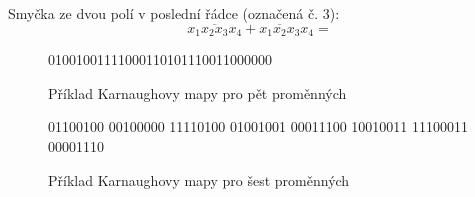      Smyčka ze dvou polí v poslední řádce (označená č. 3):
     \begin{equation}
       x_1\overline{x_2x_3}x_4 + x_1\overline{x_2}x_3x_4 = 
     \end{equation}     
     \begin{figure}[ht!]
         \centering
            {01001001111000110101110011000000}{}  
        \caption{Příklad Karnaughovy mapy pro pět proměnných}\label{CES:karnaugh_5}
      \end{figure}

     \begin{figure}[hb!]
         \centering                 
          {{0}{1}{1}{0}{0}{1}{0}{0}%
           {0}{0}{1}{0}{0}{0}{0}{0}%
           {1}{1}{1}{1}{0}{1}{0}{0}%
           {0}{1}{0}{0}{1}{0}{0}{1}%
           {0}{0}{0}{1}{1}{1}{0}{0}%
           {1}{0}{0}{1}{0}{0}{1}{1}%
           {1}{1}{1}{0}{0}{0}{1}{1}%
           {0}{0}{0}{0}{1}{1}{1}{0}}{}%
        \caption{Příklad Karnaughovy mapy pro šest proměnných}\label{CES:karnaugh_6}
      \end{figure}
      
\printbibliography[heading=subbibliography]      